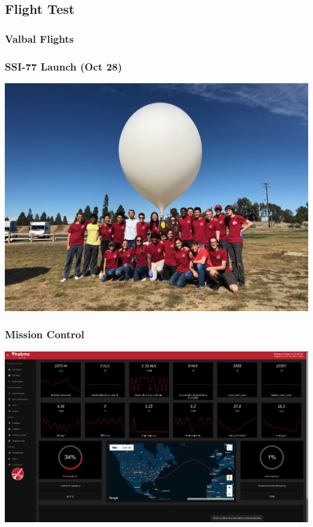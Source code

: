 \documentclass[10pt,mathserif]{beamer}
\begin{document}
\subsection{Flight Test}

\begin{frame}
\frametitle{Valbal Flights}
\end{frame}

\begin{frame}
\frametitle{SSI-77 Launch (Oct 28)}
\includegraphics[width=1\linewidth,trim={0 2cm 0 2cm},clip]{launch.jpg}
\end{frame}

\begin{frame}
\frametitle{Mission Control}
\hspace*{-1cm}\includegraphics[width=1.2\linewidth,trim={0 0cm 0 0cm},clip]{habmc.png}
\end{frame}
\end{document}
